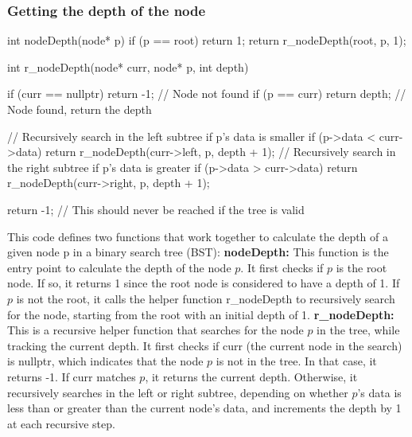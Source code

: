 \documentclass{report}
\begin{document}
    \subsubsection{Getting the depth of the node}
    \bigbreak \noindent 
    \begin{cppcode}
        int nodeDepth(node* p) {
            if (p == root) return 1;
            return r_nodeDepth(root, p, 1);
        }

        int r_nodeDepth(node* curr, node* p, int depth) {
            if (curr == nullptr) {
                return -1;  // Node not found
            }
            if (p == curr) {
                return depth;  // Node found, return the depth
            }

            // Recursively search in the left subtree if p's data is smaller
            if (p->data < curr->data) {
                return r_nodeDepth(curr->left, p, depth + 1);
            }
            // Recursively search in the right subtree if p's data is greater
            if (p->data > curr->data) {
                return r_nodeDepth(curr->right, p, depth + 1);
            }

            return -1;  // This should never be reached if the tree is valid
        }
    \end{cppcode}
    \bigbreak \noindent 
    This code defines two functions that work together to calculate the depth of a given node p in a binary search tree (BST):
    \bigbreak \noindent 
    \textbf{nodeDepth:}
    This function is the entry point to calculate the depth of the node $p$.
    \bigbreak \noindent 
    It first checks if $p$ is the root node. If so, it returns 1 since the root node is considered to have a depth of 1.
    \bigbreak \noindent 
    If $p$ is not the root, it calls the helper function r\_nodeDepth to recursively search for the node, starting from the root with an initial depth of 1.
    \bigbreak \noindent 
    \textbf{r\_nodeDepth:}
    This is a recursive helper function that searches for the node $p$ in the tree, while tracking the current depth.
    \bigbreak \noindent 
    It first checks if curr (the current node in the search) is nullptr, which indicates that the node $p$ is not in the tree. In that case, it returns -1.
    \bigbreak \noindent 
    If curr matches $p$, it returns the current depth.
    \bigbreak \noindent 
    Otherwise, it recursively searches in the left or right subtree, depending on whether $p$'s data is less than or greater than the current node's data, and increments the depth by 1 at each recursive step.
\end{document}
